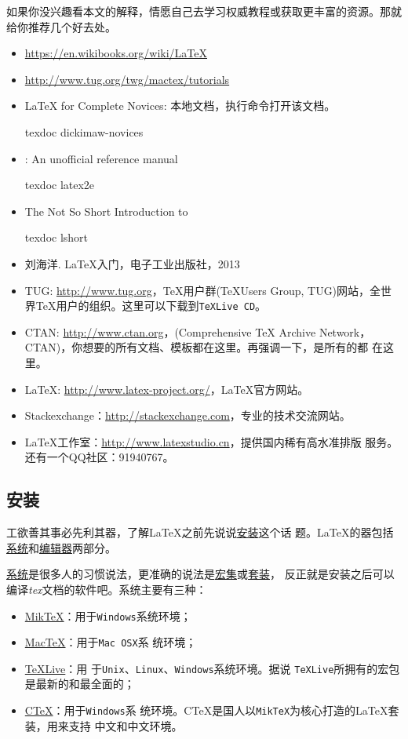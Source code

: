 如果你没兴趣看本文的解释，情愿自己去学习权威教程或获取更丰富的资源。那就
给你推荐几个好去处。

\begin{itemize}
\item \url{https://en.wikibooks.org/wiki/LaTeX}
\item \url{http://www.tug.org/twg/mactex/tutorials}
\item \LaTeX{} for Complete Novices: 本地文档，执行命令打开该文档。
  \begin{cmd} texdoc dickimaw-novices
  \end{cmd}
 \item \LaTeXe{}: An unofficial reference manual
  \begin{cmd} texdoc latex2e
 \end{cmd}
 \item The Not So Short Introduction to \LaTeXe{}
   \begin{cmd} texdoc lshort
   \end{cmd}
\item 刘海洋. \LaTeX{}入门，电子工业出版社，2013
\item TUG: \url{http://www.tug.org}，\TeX{}用户群(\TeX Users Group,
  TUG)网站，全世界\TeX{}用户的组织。这里可以下载到\texttt{TeXLive CD}。
\item CTAN: \url{http://www.ctan.org}，(Comprehensive TeX Archive
  Network，CTAN)，你想要的所有文档、模板都在这里。再强调一下，是所有的都
  在这里。
\item LaTeX: \url{http://www.latex-project.org/}，\LaTeX{}官方网站。
\item Stackexchange：\url{http://stackexchange.com}，专业的技术交流网站。
\item \LaTeX{}工作室：\url{http://www.latexstudio.cn}，提供国内稀有高水准排版
  服务。还有一个QQ社区：91940767。
\end{itemize}

\subsection{安装}

工欲善其事必先利其器，了解\LaTeX{}之前先说说\uline {安装}这个话
题。\LaTeX{}的器包括\uline{系统}和\uline{编辑器}两部分。

\uline{系统}是很多人的习惯说法，更准确的说法是\uline{宏集}或\uline{套装}，
反正就是安装之后可以编译\textit{tex}文档的软件吧。系统主要有三种：
\begin{itemize}
\item \href{https://miktex.org/}{MikTeX}：用于\texttt{Windows}系统环境；
\item \href{https://www.tug.org/mactex/}{MacTeX}：用于\texttt{Mac OSX}系
  统环境；
\item \href{http://tug.org/}{TeXLive}：用
  于\texttt{Unix}、\texttt{Linux}、\texttt{Windows}系统环境。据说
  \texttt{TeXLive}所拥有的宏包是最新的和最全面的；
\item \href{http://www.ctex.org/HomePage}{CTeX}：用于\texttt{Windows}系
  统环境。CTeX是国人以\texttt{MikTeX}为核心打造的\LaTeX{}套装，用来支持
  中文和中文环境。
\end{itemize}

